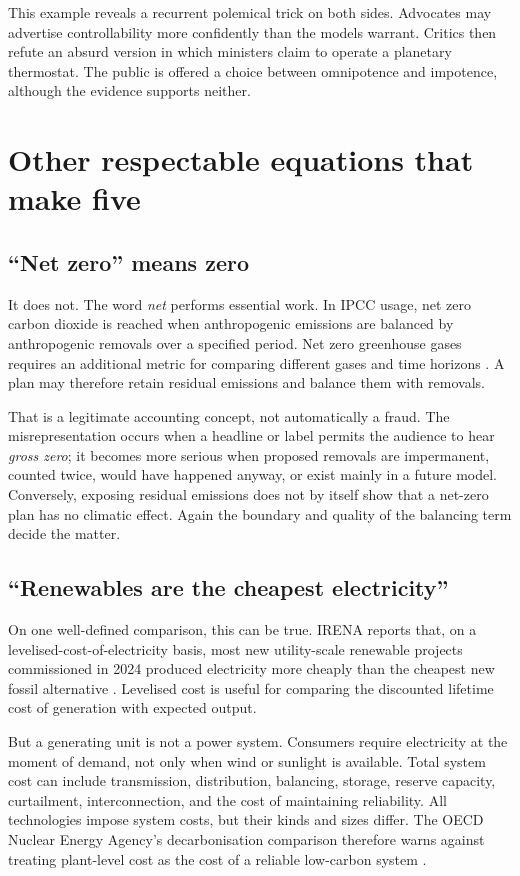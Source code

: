 ﻿\documentclass[12pt,a4paper]{book}
\begin{document}
This example reveals a recurrent polemical trick on both sides.  Advocates may
advertise controllability more confidently than the models warrant.  Critics
then refute an absurd version in which ministers claim to operate a planetary
thermostat.  The public is offered a choice between omnipotence and impotence,
although the evidence supports neither.

\section{Other respectable equations that make five}

\subsection{``Net zero'' means zero}

It does not.  The word \emph{net} performs essential work.  In IPCC usage, net
zero carbon dioxide is reached when anthropogenic emissions are balanced by
anthropogenic removals over a specified period.  Net zero greenhouse gases
requires an additional metric for comparing different gases and time horizons
\cite{IPCCWGI2021TechnicalSummary}.  A plan may therefore retain residual
emissions and balance them with removals.

That is a legitimate accounting concept, not automatically a fraud.  The
misrepresentation occurs when a headline or label permits the audience to hear
\emph{gross zero}; it becomes more serious when proposed removals are
impermanent, counted twice, would have happened anyway, or exist mainly in a
future model.  Conversely, exposing residual emissions does not by itself show
that a net-zero plan has no climatic effect.  Again the boundary and quality of
the balancing term decide the matter.

\subsection{``Renewables are the cheapest electricity''}

On one well-defined comparison, this can be true.  IRENA reports that, on a
levelised-cost-of-electricity basis, most new utility-scale renewable projects
commissioned in 2024 produced electricity more cheaply than the cheapest new
fossil alternative \cite{IRENARenewableCosts2024}.  Levelised cost is useful
for comparing the discounted lifetime cost of generation with expected
output.

But a generating unit is not a power system.  Consumers require electricity
at the moment of demand, not only when wind or sunlight is available.  Total
system cost can include transmission, distribution, balancing, storage,
reserve capacity, curtailment, interconnection, and the cost of maintaining
reliability.  All technologies impose system costs, but their kinds and sizes
differ.  The OECD Nuclear Energy Agency's decarbonisation comparison therefore
warns against treating plant-level cost as the cost of a reliable low-carbon
system \cite{OECDNEASystemCosts2019}.
\end{document}
